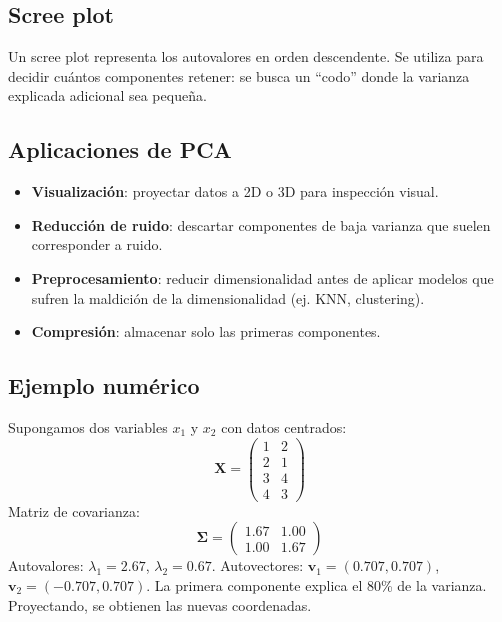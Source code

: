\documentclass[12pt,a4paper,openany,oneside]{book}
\begin{document}
\subsection{Scree plot}
Un scree plot representa los autovalores en orden descendente. Se utiliza para decidir cuántos componentes retener: se busca un ``codo'' donde la varianza explicada adicional sea pequeña.

\begin{center}
\caption{Ejemplo de scree plot. El codo se observa entre el segundo y tercer componente.}
\end{center}

\subsection{Aplicaciones de PCA}
\begin{itemize}
    \item \textbf{Visualización}: proyectar datos a 2D o 3D para inspección visual.
    \item \textbf{Reducción de ruido}: descartar componentes de baja varianza que suelen corresponder a ruido.
    \item \textbf{Preprocesamiento}: reducir dimensionalidad antes de aplicar modelos que sufren la maldición de la dimensionalidad (ej. KNN, clustering).
    \item \textbf{Compresión}: almacenar solo las primeras componentes.
\end{itemize}

\subsection{Ejemplo numérico}
Supongamos dos variables \(x_1\) y \(x_2\) con datos centrados:
\[
\mathbf{X} = \begin{pmatrix}
1 & 2 \\
2 & 1 \\
3 & 4 \\
4 & 3
\end{pmatrix}
\]
Matriz de covarianza:
\[
\mathbf{\Sigma} = \begin{pmatrix}
1.67 & 1.00 \\
1.00 & 1.67
\end{pmatrix}
\]
Autovalores: \(\lambda_1 = 2.67\), \(\lambda_2 = 0.67\). Autovectores: \(\mathbf{v}_1 = (0.707, 0.707)\), \(\mathbf{v}_2 = (-0.707, 0.707)\). La primera componente explica el 80\% de la varianza. Proyectando, se obtienen las nuevas coordenadas.
\end{document}
